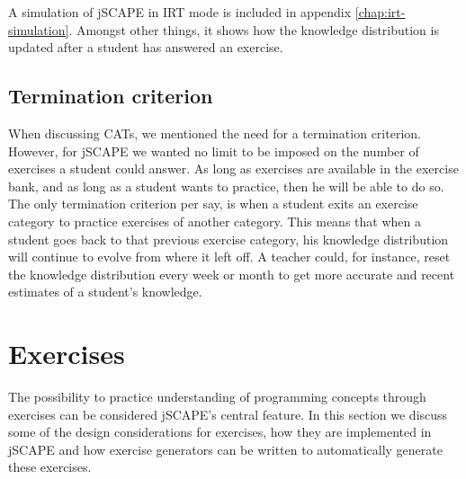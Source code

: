 A simulation of jSCAPE in IRT mode is included in appendix \ref{chap:irt-simulation}. Amongst other things, it shows how the knowledge distribution is updated after a student has answered an exercise.

\subsection{Termination criterion}
When discussing CATs, we mentioned the need for a termination criterion. However, for jSCAPE we wanted no limit to be imposed on the number of exercises a student could answer. As long as exercises are available in the exercise bank, and as long as a student wants to practice, then he will be able to do so. The only termination criterion per say, is when a student exits an exercise category to practice exercises of another category. This means that when a student goes back to that previous exercise category, his knowledge distribution will continue to evolve from where it left off. A teacher could, for instance, reset the knowledge distribution every week or month to get more accurate and recent estimates of a student's knowledge.

\section{Exercises}
\label{sec:exercises-implementation}
The possibility to practice understanding of programming concepts through exercises can be considered jSCAPE's central feature. In this section we discuss some of the design considerations for exercises, how they are implemented in jSCAPE and how exercise generators can be written to automatically generate these exercises.

